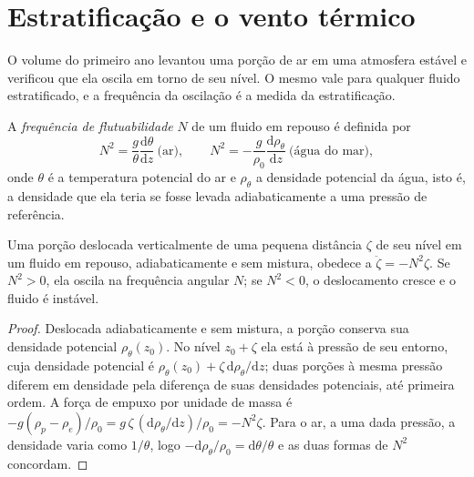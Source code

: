 \section{Estratificação e o vento térmico}\label{sec:b3:gfd-foundations:stratification}

O volume do primeiro ano levantou uma porção de ar em uma atmosfera estável e
verificou que ela oscila em torno de seu nível. O mesmo vale para qualquer fluido
estratificado, e a frequência da oscilação é a medida da estratificação.

\begin{definition}\label{def:b3:gfd-foundations:buoyancy}
A \emph{frequência de flutuabilidade} $N$ de um fluido em
repouso é definida por
\[
N^2 = \frac{g}{\theta}\frac{\mathrm d\theta}{\mathrm dz}\ \text{(ar)},
\qquad
N^2 = -\frac{g}{\rho_0}\frac{\mathrm d\rho_\theta}{\mathrm dz}\ \text{(água do mar)},
\]
onde $\theta$ é a temperatura potencial do ar e $\rho_\theta$ a
densidade potencial da água, isto é, a densidade que ela teria se fosse
levada adiabaticamente a uma pressão de referência.
\end{definition}

\begin{theorem}\label{thm:b3:gfd-foundations:buoyancy}
Uma porção deslocada verticalmente de uma pequena distância $\zeta$ de seu nível em um
fluido em repouso, adiabaticamente e sem mistura, obedece a $\ddot\zeta =
-N^2\zeta$. Se $N^2 > 0$, ela oscila na frequência angular $N$; se
$N^2 < 0$, o deslocamento cresce e o fluido é instável.
\end{theorem}

\begin{proof}
Deslocada adiabaticamente e sem mistura, a porção conserva sua densidade potencial
$\rho_\theta(z_0)$. No nível $z_0 + \zeta$ ela está à pressão de seu entorno, cuja
densidade potencial é $\rho_\theta(z_0) +
\zeta\,\mathrm d\rho_\theta/\mathrm dz$; duas porções à mesma pressão
diferem em densidade pela diferença de suas densidades potenciais, até primeira
ordem. A força de empuxo por unidade de massa é $-g(\rho_p - \rho_e)/\rho_0 =
g\,\zeta\,(\mathrm d\rho_\theta/\mathrm dz)/\rho_0 = -N^2\zeta$. Para o ar, a
uma dada pressão, a densidade varia como $1/\theta$, logo $-\mathrm
d\rho_\theta/\rho_0 = \mathrm d\theta/\theta$ e as duas formas de $N^2$
concordam.
\end{proof}

